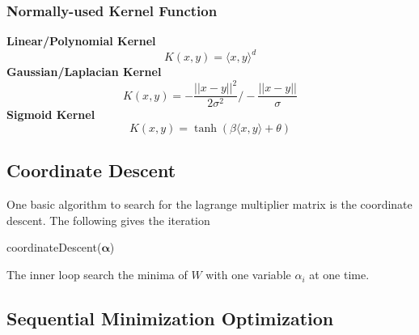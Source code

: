 \documentclass[12pt]{article}
\newcommand{\la}{\langle}
\newcommand{\ra}{\rangle}
\begin{document}
\subsubsection{Normally-used Kernel Function}
\noindent \textbf{Linear/Polynomial Kernel} 
\begin{equation}
    K(x, y) = \la x, y \ra^d
\end{equation}
\textbf{Gaussian/Laplacian Kernel}
\begin{equation}
    K(x, y) = -\frac{||x - y||^2}{2\sigma^2} \bigg/ -\frac{||x-y||}{\sigma}
\end{equation}
\textbf{Sigmoid Kernel}
\begin{equation}
    K(x, y) = \tanh \left( \beta \la x, y \ra + \theta\right)
\end{equation}
\subsection{Coordinate Descent}
One basic algorithm to search for the lagrange multiplier matrix is the coordinate descent. The following gives the iteration
\begin{algorithm}[H]
    \caption{coordinateDescent($\bm{\alpha}$)}
    \label{coorDes}
    \begin{algorithmic}
        \ENDFOR
        \ENDWHILE
    \end{algorithmic}
\end{algorithm}
The inner loop search the minima of $W$ with one variable $\alpha_i$ at one time.
\subsection{Sequential Minimization Optimization}
\end{document}
